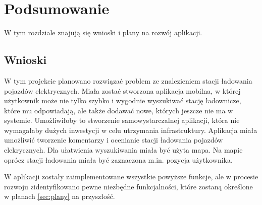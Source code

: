 \chapter{Podsumowanie}
W tym rozdziale znajują się wnioski i plany na rozwój aplikacji.

\section{Wnioski}


W tym projekcie planowano rozwiązać problem ze znalezieniem stacji ładowania pojazdów elektrycznych. Miała zostać stworzona aplikacja mobilna, w której użytkownik może nie tylko szybko i wygodnie wyszukiwać stację ładownicze, które mu odpowiadają, ale także dodawać nowe, których jeszcze nie ma w systemie.
Umożliwiłoby to stworzenie samowystarczalnej aplikacji, która nie wymagałaby dużych inwestycji w celu utrzymania infrastruktury. Aplikacja miała umożliwić tworzenie komentarzy i ocenianie stacji ładowania pojazdów elekrycznych. Dla ułatwienia wyszukiwania miała być użyta mapa.
Na mapie oprócz stacji ładowania miała być zaznaczona m.in. pozycja użytkownika.

W aplikacji zostały zaimplementowane wszystkie powyższe funkcje, ale w procesie rozwoju zidentyfikowano pewne niezbędne funkcjalności, które zostaną określone w planach \ref{sec:plany} na przyszłość.

